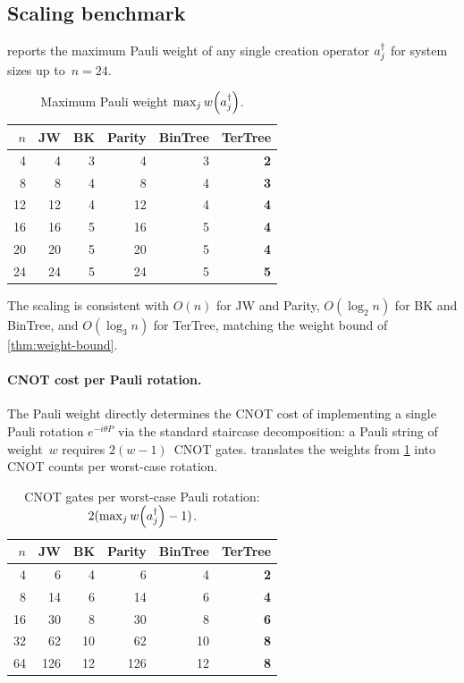 \subsection{Scaling benchmark}
\label{sec:val-scaling}

 reports the maximum Pauli weight of any single
creation operator $a_{j}^{\dagger}$ for system sizes up to~$n = 24$.

\begin{table}[t]
\centering
\caption{Maximum Pauli weight $\max_j w\!\left(a_{j}^{\dagger}\right)$.}
\label{tab:scaling}
\begin{tabular}{@{}rrrrrr@{}}
\toprule
$n$ & JW & BK & Parity & BinTree & TerTree \\
\midrule
 4  &  4 &  3 &  4 &  3 & \textbf{2} \\
 8  &  8 &  4 &  8 &  4 & \textbf{3} \\
12  & 12 &  4 & 12 &  4 & \textbf{4} \\
16  & 16 &  5 & 16 &  5 & \textbf{4} \\
20  & 20 &  5 & 20 &  5 & \textbf{4} \\
24  & 24 &  5 & 24 &  5 & \textbf{5} \\
\bottomrule
\end{tabular}
\end{table}

The scaling is consistent with $O(n)$ for JW and Parity,
$O(\log_2 n)$ for BK and BinTree, and $O(\log_3 n)$ for TerTree,
matching the weight bound of \cref{thm:weight-bound}.

\paragraph{CNOT cost per Pauli rotation.}
The Pauli weight directly determines the CNOT cost of implementing a
single Pauli rotation $e^{-i\theta P}$ via the standard staircase
decomposition: a Pauli string of weight~$w$ requires $2(w-1)$~CNOT
gates.   translates the weights from
\cref{tab:scaling} into CNOT counts per worst-case rotation.

\begin{table}[t]
\centering
\caption{CNOT gates per worst-case Pauli rotation: $2(\max_j w\!\left(a_{j}^{\dagger}\right) - 1)$.}
\label{tab:cnot-cost}
\begin{tabular}{@{}rrrrrr@{}}
\toprule
$n$ & JW & BK & Parity & BinTree & TerTree \\
\midrule
 4  &   6 &  4 &   6 &  4 & \textbf{2} \\
 8  &  14 &  6 &  14 &  6 & \textbf{4} \\
16  &  30 &  8 &  30 &  8 & \textbf{6} \\
32  &  62 & 10 &  62 & 10 & \textbf{8} \\
64  & 126 & 12 & 126 & 12 & \textbf{8} \\
\bottomrule
\end{tabular}
\end{table}

